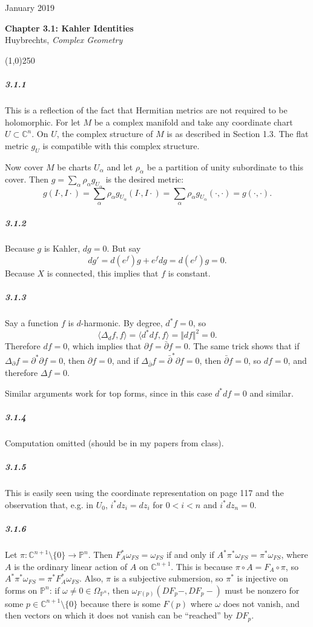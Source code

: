 \documentclass[10pt,letter]{article}
\begin{document}
\noindent 
January 2019
\begin{center}
\textbf{Chapter 3.1: Kahler Identities}\\ Huybrechts, \textit{Complex Geometry}

\line(1,0){250}
\end{center}

\subparagraph{3.1.1} This is a reflection of the fact that Hermitian metrics are not required to be holomorphic. For let $M$ be a complex manifold and take any coordinate chart $U \subset \mathbb{C}^n$. On $U$, the complex structure of $M$ is as described in Section 1.3. The flat metric $g_U$ is compatible with this complex structure. 

Now cover $M$ be charts $U_{\alpha}$ and let $\rho_{\alpha}$ be a partition of unity subordinate to this cover. Then $g = \sum_{\alpha} \rho_{\alpha} g_{U_{\alpha}}$ is the desired metric:
\[ g(I\cdot, I\cdot) = \sum_{\alpha} \rho_{\alpha} g_{U_{\alpha}}(I\cdot, I\cdot) = \sum_{\alpha}  \rho_{\alpha} g_{U_{\alpha}}(\cdot, \cdot) = g(\cdot,\cdot).\]  

\subparagraph{3.1.2}Because $g$ is Kahler, $dg = 0$. But say \[ dg' = d(e^{f}) g + e^f dg = d(e^f) g = 0.\]
Because $X$ is connected, this implies that $f$ is constant. 

\subparagraph{3.1.3} Say a function $f$ is $d$-harmonic. By degree, $d^{\ast}f = 0$, so 
\[ \langle \Delta_d f,f \rangle = \langle d^{\ast}d f, f \rangle = \Vert df \Vert^2 = 0.\]
Therefore $df = 0$, which implies that $\partial f = \bar{\partial} f = 0$. The same trick shows that if $\Delta_{\partial}f = \partial^{\ast} \partial f = 0$, then $\partial f = 0$, and if $\Delta_{\bar{\partial}}f = \bar{\partial}^{\ast} \partial f = 0$, then $\bar{\partial} f = 0$, so $df = 0$, and therefore $\Delta f = 0$.

Similar arguments work for top forms, since in this case $d^{\ast}d f = 0$ and similar.

\subparagraph{3.1.4} Computation omitted (should be in my papers from class).

\subparagraph{3.1.5} This is easily seen using the coordinate representation on page 117 and the observation that, e.g. in $U_0$, $i^{\ast} dz_i = dz_i$ for $0 < i < n$ and $i^{\ast} dz_n = 0$. 

\subparagraph{3.1.6} Let $\pi: \mathbb{C}^{n+1}\setminus \lbrace 0 \rbrace \rightarrow \mathbb{P}^n$. Then $F_A^{\ast} \omega_{FS} = \omega_{FS}$ if and only if $A^{\ast} \pi^{\ast} \omega_{FS} = \pi^{\ast} \omega_{FS}$, where $A$ is the ordinary linear action of $A$ on $\mathbb{C}^{n+1}$. This is because $\pi \circ A = F_A \circ \pi$, so $A^{\ast} \pi^{\ast} \omega_{FS} = \pi^{\ast} F_A^{\ast} \omega_{FS}$. Also, $\pi$ is a subjective submersion, so $\pi^{\ast}$ is injective on forms on $\mathbb{P}^n$: if $\omega \neq 0 \in \Omega_{\mathbb{P}^n}$, then $\omega_{F(p)}(DF_p -, DF_p -)$ must be nonzero for some $p \in \mathbb{C}^{n+1}\setminus \lbrace 0 \rbrace$ because there is some $F(p)$ where $\omega$ does not vanish, and then vectors on which it does not vanish can be ``reached'' by $DF_p$. 
\end{document}
